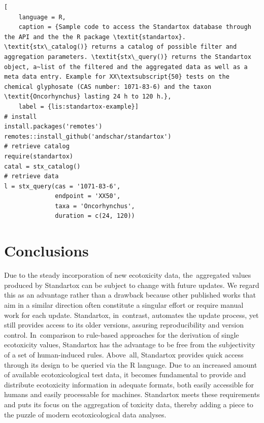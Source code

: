 \documentclass[data,datadescriptor,accept,moreauthors,pdftex]{Definitions/mdpi}
\begin{document}
\begin{lstlisting}[
    language = R,
    caption = {Sample code to access the Standartox database through the API and the the R package \textit{standartox}. \textit{stx\_catalog()} returns a catalog of possible filter and aggregation parameters. \textit{stx\_query()} returns the Standartox object, a~list of the filtered and the aggregated data as well as a meta data entry. Example for XX\textsubscript{50} tests on the chemical glyphosate (CAS number: 1071-83-6) and the taxon \textit{Oncorhynchus} lasting 24 h to 120 h.},
    label = {lis:standartox-example}]
# install
install.packages('remotes')
remotes::install_github('andschar/standartox')
# retrieve catalog    
require(standartox)
catal = stx_catalog()
# retrieve data
l = stx_query(cas = '1071-83-6',
              endpoint = 'XX50',
              taxa = 'Oncorhynchus',
              duration = c(24, 120))
\end{lstlisting}
\newpage
\section{Conclusions}
Due to the steady incorporation of new ecotoxicity data, the~aggregated values produced by Standartox can be subject to change with future updates. We regard this as an advantage rather than a drawback because other published works that aim in a similar direction often constitute a singular effort or require manual work for each update. Standartox, in~contrast, automates the update process, yet still provides access to its older versions, assuring reproducibility and version control. In~comparison to rule-based approaches for the derivation of single ecotoxicity values, Standartox has the advantage to be free from the subjectivity of a set of human-induced rules. Above~all, Standartox provides quick access through its design to be queried via the R language. Due to an increased amount of available ecotoxicological test data, it becomes fundamental to provide and distribute ecotoxicity information in adequate formats, both easily accessible for humans and easily processable for machines. Standartox meets these requirements and puts its focus on the aggregation of toxicity data, thereby adding a piece to the puzzle of modern ecotoxicological data analyses.

\vspace{6pt} 
\end{document}
